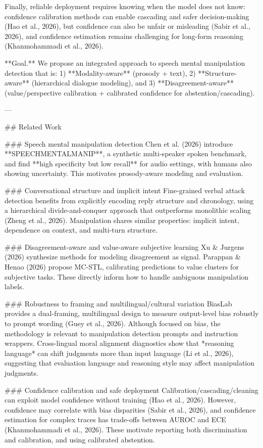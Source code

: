Finally, reliable deployment requires knowing when the model does not know: confidence calibration methods can enable cascading and safer decision-making (Hao et al., 2026), but confidence can also be unfair or misleading (Sabir et al., 2026), and confidence estimation remains challenging for long-form reasoning (Khanmohammadi et al., 2026).

**Goal.** We propose an integrated approach to speech mental manipulation detection that is:  
1) **Modality-aware** (prosody + text),  
2) **Structure-aware** (hierarchical dialogue modeling), and  
3) **Disagreement-aware** (value/perspective calibration + calibrated confidence for abstention/cascading).

---

## Related Work  

### Speech mental manipulation detection  
Chen et al. (2026) introduce **SPEECHMENTALMANIP**, a synthetic multi-speaker spoken benchmark, and find **high specificity but low recall** for audio settings, with humans also showing uncertainty. This motivates prosody-aware modeling and evaluation.

### Conversational structure and implicit intent  
Fine-grained verbal attack detection benefits from explicitly encoding reply structure and chronology, using a hierarchical divide-and-conquer approach that outperforms monolithic scaling (Zheng et al., 2026). Manipulation shares similar properties: implicit intent, dependence on context, and multi-turn structure.

### Disagreement-aware and value-aware subjective learning  
Xu & Jurgens (2026) synthesize methods for modeling disagreement as signal. Parappan & Henao (2026) propose MC-STL, calibrating predictions to value clusters for subjective tasks. These directly inform how to handle ambiguous manipulation labels.

### Robustness to framing and multilingual/cultural variation  
BiasLab provides a dual-framing, multilingual design to measure output-level bias robustly to prompt wording (Guey et al., 2026). Although focused on bias, the methodology is relevant to manipulation detection prompts and instruction wrappers. Cross-lingual moral alignment diagnostics show that *reasoning language* can shift judgments more than input language (Li et al., 2026), suggesting that evaluation language and reasoning style may affect manipulation judgments.

### Confidence calibration and safe deployment  
Calibration/cascading/cleaning can exploit model confidence without training (Hao et al., 2026). However, confidence may correlate with bias disparities (Sabir et al., 2026), and confidence estimation for complex traces has trade-offs between AUROC and ECE (Khanmohammadi et al., 2026). These motivate reporting both discrimination and calibration, and using calibrated abstention.


